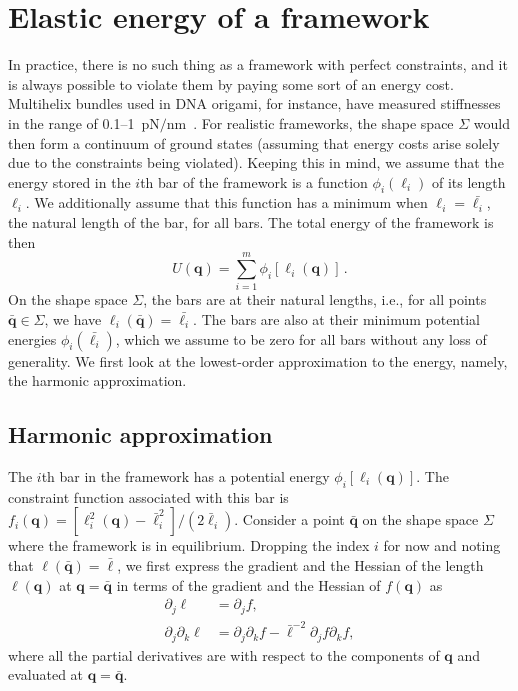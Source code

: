 \section{Elastic energy of a framework}
\label{sec:energy}

In practice, there is no such thing as a framework with perfect constraints, and it is always possible to violate them by paying some sort of an energy cost.
Multihelix bundles used in DNA origami, for instance, have measured stiffnesses in the range of 0.1--1~pN$/$nm~\cite{jung2020}.
For realistic frameworks, the shape space $\Sigma$ would then form a continuum of ground states (assuming that energy costs arise solely due to the constraints being violated).
Keeping this in mind, we assume that the energy stored in the $i$th bar of the framework is a function $\phi_i(\ell_i)$ of its length $\ell_i$.
We additionally assume that this function has a minimum when $\ell_i = \bar{\ell_i}$, the natural length of the bar, for all bars.
The total energy of the framework is then
%
\begin{equation}
  U({\bm{q}}) = \sum_{i=1}^{m} \phi_i[\ell_i({\bm{q}})]\,.
\end{equation}
%
On the shape space $\Sigma$, the bars are at their natural lengths, i.e., for all points $\bar{\bm{q}} \in \Sigma$, we have $\ell_i(\bar{\bm{q}}) = \bar{\ell_i}$.
The bars are also at their minimum potential energies $\phi_i(\bar{\ell_i})$, which we assume to be zero for all bars without any loss of generality.
We first look at the lowest-order approximation to the energy, namely, the harmonic approximation.

\subsection{Harmonic approximation}

The $i$th bar in the framework has a potential energy $\phi_i[\ell_i(\bm{q})]$.
The constraint function associated with this bar is $f_i(\bm{q}) = [\ell_i^2(\bm{q}) - \bar{\ell}_i^2]/(2\bar{\ell}_i)$.
Consider a point $\bar{\bm{q}}$ on the shape space $\Sigma$ where the framework is in equilibrium.
Dropping the index $i$ for now and noting that $\ell(\bar{\bm{q}}) = \bar{\ell}$, we first express the gradient and the Hessian of the length $\ell(\bm{q})$ at $\bm{q} = \bar{\bm{q}}$ in terms of the gradient and the Hessian of $f(\bm{q})$ as
%
\begin{equation}
\begin{aligned}
  \partial_j \ell &= \partial_j f,\\
  \partial_j\partial_k \ell &= \partial_j\partial_k f - \bar{\ell}^{-2}\partial_j f\partial_k f,
  \label{sm:eq:lentomap}
\end{aligned}
\end{equation}
%
where all the partial derivatives are with respect to the components of $\bm{q}$ and evaluated at $\bm{q} = \bar{\bm{q}}$.

